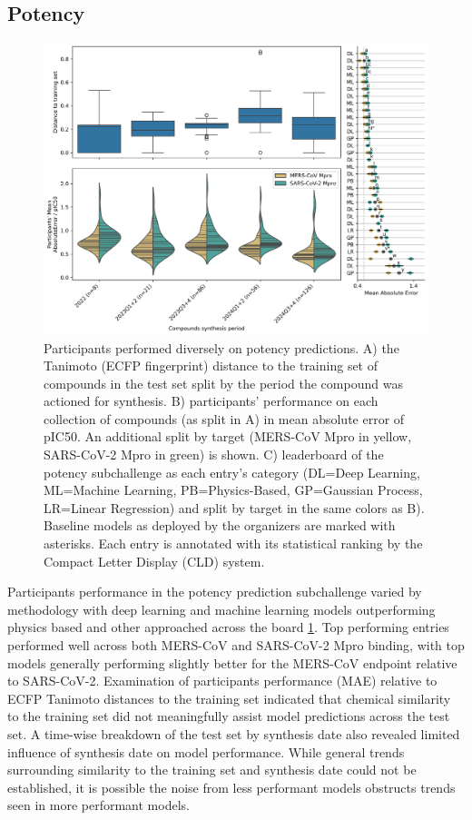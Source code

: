 \documentclass[journal=jcim,manuscript=article]{achemso}
\begin{document}
\subsection{Potency}


\begin{figure}
    \includegraphics[scale=0.6]{04_figs_leaderboards/potency_leaderboards_and_progressions.png}
  \caption{Participants performed diversely on potency predictions. A) the Tanimoto (ECFP fingerprint) distance to the training set of compounds in the test set split by the period the compound was actioned for synthesis. B) participants' performance on each collection of compounds (as split in A) in mean absolute error of pIC50. An additional split by target (MERS-CoV Mpro in yellow, SARS-CoV-2 Mpro in green) is shown. C) leaderboard of the potency subchallenge as each entry's category (DL=Deep Learning, ML=Machine Learning, PB=Physics-Based, GP=Gaussian Process, LR=Linear Regression) and split by target in the same colors as B). Baseline models as deployed by the organizers are marked with asterisks. Each entry is annotated with its statistical ranking by the Compact Letter Display (CLD) system\cite{cld_algorithm_2004}.}
  \label{fgr:potency_leaderboards}
\end{figure}

Participants performance in the potency prediction subchallenge varied by methodology with deep learning and machine learning models outperforming physics based and other approached across the board \ref{fgr:potency_leaderboards}. Top performing entries performed well across both MERS-CoV and SARS-CoV-2 Mpro binding, with top models generally performing slightly better for the MERS-CoV endpoint relative to SARS-CoV-2. Examination of participants performance (MAE) relative to ECFP Tanimoto distances to the training set indicated that chemical similarity to the training set did not meaningfully assist model predictions across the test set. A time-wise breakdown of the test set by synthesis date also revealed limited influence of synthesis date on model performance. While general trends surrounding similarity to the training set and synthesis date could not be established, it is possible the noise from less performant models obstructs trends seen in more performant models.
\end{document}
